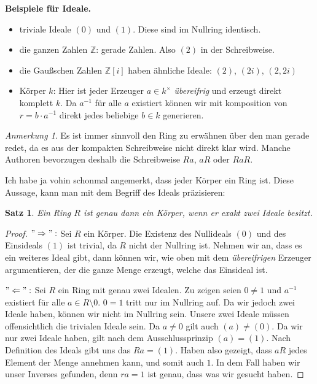 \documentclass{article}
\newtheorem*{satz}{Satz}
\theoremstyle{definition}
\theoremstyle{remark}
\newtheorem*{anm}{Anmerkung}
\begin{document}
\vspace{0.7em}
\textbf{Beispiele für Ideale.}
\begin{itemize}
    \item triviale Ideale $(0)$ und $(1)$. Diese sind im Nullring identisch.
    \item die ganzen Zahlen $\mathbb Z$: gerade Zahlen. Also $(2)$ in der Schreibweise.
    \item die Gaußschen Zahlen $\mathbb Z[i]$ haben ähnliche Ideale: $(2)$, $(2i)$, $(2,2i)$
    \item Körper $k$: Hier ist jeder Erzeuger $a\in k^\times$ \emph{übereifrig} und erzeugt direkt komplett $k$.        Da $a^{-1}$ für alle $a$ existiert können wir mit komposition von $r=b\cdot a^{-1}$ direkt jedes beliebige            $b\in k$ generieren.
\end{itemize}

\begin{anm}
Es ist immer sinnvoll den Ring zu erwähnen über den man gerade redet, da es aus der kompakten Schreibweise
nicht direkt klar wird. Manche Authoren bevorzugen deshalb die Schreibweise $Ra$, $aR$ oder $RaR$.
\end{anm}

Ich habe ja vohin schonmal angemerkt, dass jeder Körper ein Ring ist. Diese Aussage, kann man mit dem
Begriff des Ideals präzisieren:

\begin{satz}
Ein Ring $R$ ist genau dann ein Körper, wenn er exakt zwei Ideale besitzt.
\end{satz}
\begin{proof} $"\Rightarrow":$ Sei $R$ ein Körper. Die Existenz des Nullideals $(0)$ und des Einsideals $(1)$
ist trivial, da $R$ nicht der Nullring ist. Nehmen wir an, dass es ein weiteres Ideal gibt, dann können wir,
wie oben mit dem \emph{übereifrigen} Erzeuger argumentieren, der die ganze Menge erzeugt, welche das Einsideal
ist.

\vspace{0.7em}
$"\Leftarrow":$ Sei $R$ ein Ring mit genau zwei Idealen. Zu zeigen seien $0\ne1$ und $a^{-1}$ existiert für
alle $a\in R\setminus 0$. $0=1$ tritt nur im Nullring auf. Da wir jedoch zwei Ideale haben, können wir nicht im
Nullring sein. Unsere zwei Ideale müssen offensichtlich die trivialen Ideale sein. Da $a\ne0$ gilt auch
$(a)\ne(0)$. Da wir nur zwei Ideale haben, gilt nach dem Ausschlussprinzip $(a)=(1)$. Nach Definition des Ideals gibt uns das
$Ra=(1)$. Haben also gezeigt, dass $aR$ jedes Element der Menge annehmen kann, und somit auch $1$. In dem Fall
haben wir unser Inverses gefunden, denn $ra=1$ ist genau, dass was wir gesucht haben.
\end{proof}
\end{document}
